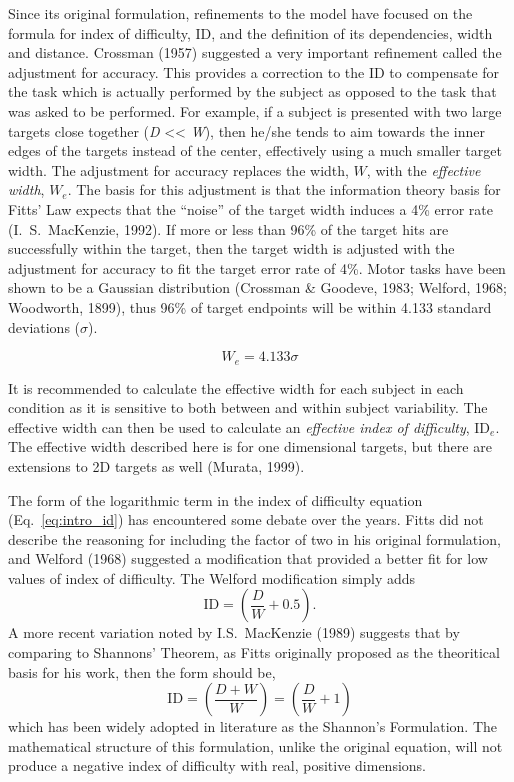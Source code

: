 Since its original formulation, refinements to the model have focused on the formula for index of difficulty, \(\text{ID}\), and the definition of its dependencies, width and distance.
Crossman (1957) suggested a very important refinement called the adjustment for accuracy.
This provides a correction to the \(\text{ID}\) to compensate for the task which is actually performed by the subject as opposed to the task that was asked to be performed.
For example, if a subject is presented with two large targets close together (\emph{D} \textless{}\textless{} \emph{W}), then he/she tends to aim towards the inner edges of the targets instead of the center, effectively using a much smaller target width.
The adjustment for accuracy replaces the width, \(W\), with the \emph{effective width}, \(W_{e}\).
The basis for this adjustment is that the information theory basis for Fitts' Law expects that the ``noise'' of the target width induces a 4\% error rate (I.\ S.\ MacKenzie, 1992).
If more or less than 96\% of the target hits are successfully within the target, then the target width is adjusted with the adjustment for accuracy to fit the target error rate of 4\%.
Motor tasks have been shown to be a Gaussian distribution (Crossman \& Goodeve, 1983; Welford, 1968; Woodworth, 1899), thus 96\% of target endpoints will be within 4.133 standard deviations (\(\sigma\)).

\begin{equation}
W_{e} = 4.133\sigma
\end{equation}

It is recommended to calculate the effective width for each subject in each condition as it is sensitive to both between and within subject variability.
The effective width can then be used to calculate an \emph{effective index of difficulty}, \(\text{ID}_{e}\).
The effective width described here is for one dimensional targets, but there are extensions to 2D targets as well (Murata, 1999).

The form of the logarithmic term in the index of difficulty equation (Eq.\ \ref{eq:intro_id}) has encountered some debate over the years.
Fitts did not describe the reasoning for including the factor of two in his original formulation, and Welford (1968) suggested a modification that provided a better fit for low values of index of difficulty.
The Welford modification simply adds
\begin{equation}
    \mathrm{ID} = \left( \frac{D}{W} + 0.5 \right).
\end{equation}
A more recent variation noted by I.S.\ MacKenzie (1989) suggests that by comparing to Shannons' Theorem, as Fitts originally proposed as the theoritical basis for his work, then the form should be,
\begin{equation}
    \mathrm{ID} = \left( \frac{D + W}{W} \right) = \left( \frac{D}{W} + 1 \right)
\end{equation}
which has been widely adopted in literature as the Shannon's Formulation.
The mathematical structure of this formulation, unlike the original equation, will not produce a negative index of difficulty with real, positive dimensions.


